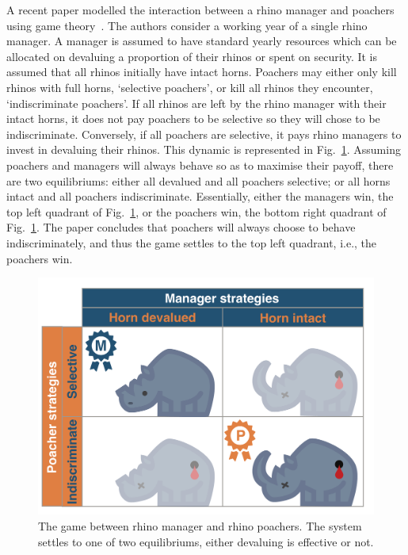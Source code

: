 \documentclass[10pt]{article}
\begin{document}
A recent paper modelled the interaction between a rhino manager and poachers
using game theory~\cite{Lee}.  The authors consider a working year of a single 
rhino manager.  A manager is assumed to have standard yearly resources which
can be allocated on devaluing a proportion of their rhinos or spent on security. 
It is assumed that all rhinos initially have intact horns. Poachers may either only
kill rhinos with full horns, `selective poachers', or kill all rhinos they encounter, 
`indiscriminate poachers'. If all rhinos are left by the rhino manager with their 
intact horns, it does not pay poachers to be selective so they will chose to be 
indiscriminate. Conversely, if all poachers are selective, it pays rhino managers 
to invest in devaluing their rhinos. This dynamic is represented in Fig.~\ref{fig:RhinoPic}.
Assuming poachers and managers will always behave so as to maximise their 
payoff, there are two equilibriums: either all devalued and all poachers selective;
or all horns intact and all poachers indiscriminate. Essentially, either the managers 
win, the top left quadrant of Fig.~\ref{fig:RhinoPic}, or the poachers win, the bottom
right quadrant of Fig.~\ref{fig:RhinoPic}. The paper concludes that poachers will
always choose to behave indiscriminately, and thus the game settles to the top
left quadrant, i.e., the poachers win.

\begin{figure}[!htbp]
    \centering
    \includegraphics[scale=0.2]{images/RhinoPic.pdf}
    \caption{\label{fig:RhinoPic} The game between rhino manager and rhino 
    poachers. The system settles to one of two equilibriums, either devaluing is effective or not.}
\end{figure}
\end{document}

